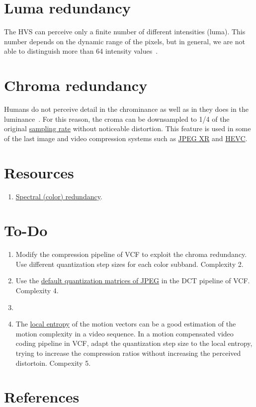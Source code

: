 \section{Luma redundancy}

The HVS can perceive only a finite number of different intensities
(luma). This number depends on the dynamic range of the pixels, but in
general, we are not able to distinguish more than 64 intensity
values~\cite{vruiz__visual_redundancy}.

\section{Chroma redundancy}

Humans do not perceive detail in the chrominance as well as in they
does in the luminance~\cite{burger2016digital}. For this reason, the
croma can be downsampled to 1/4 of the original
\href{https://en.wikipedia.org/wiki/Sampling_(signal_processing)}{sampling
  rate} without noticeable distortion. This feature is used in some of
the last image and video compression systems such as
\href{https://en.wikipedia.org/wiki/JPEG_XR#Description}{JPEG XR} and
\href{https://en.wikipedia.org/wiki/High_Efficiency_Video_Coding#Video_coding_layer}{HEVC}.

\section{Resources}
\begin{enumerate}
\item \href{https://github.com/vicente-gonzalez-ruiz/color_transforms/blob/main/docs/color_redundancy.ipynb}{Spectral
    (color) redundancy}.
\end{enumerate}

\section{To-Do}
\begin{enumerate}
\item Modify the compression pipeline of VCF to exploit the chroma
  redundancy. Use different quantization step sizes for each color
  subband. Complexity 2.
\item Use the
  \href{https://www.academia.edu/10152058/The_Optimal_Quantization_Matrices_for_JPEG_Image_Compression_From_Psychovisual_Threshold?email_work_card=view-paper}{default
    quantization matrices of JPEG} in the DCT pipeline of
  VCF. Complexity 4.
\item 
\item The
  \href{https://scikit-image.org/docs/stable/auto_examples/filters/plot_entropy.html}{local
    entropy} of the motion vectors can be a good estimation of the
  motion complexity in a video sequence. In a motion compensated video
  coding pipeline in VCF, adapt the quantization step size to the
  local entropy, trying to increase the compression ratios without
  increasing the perceived distortoin. Compexity 5.
\end{enumerate}

\section{References}

\renewcommand{\addcontentsline}[3]{}%

